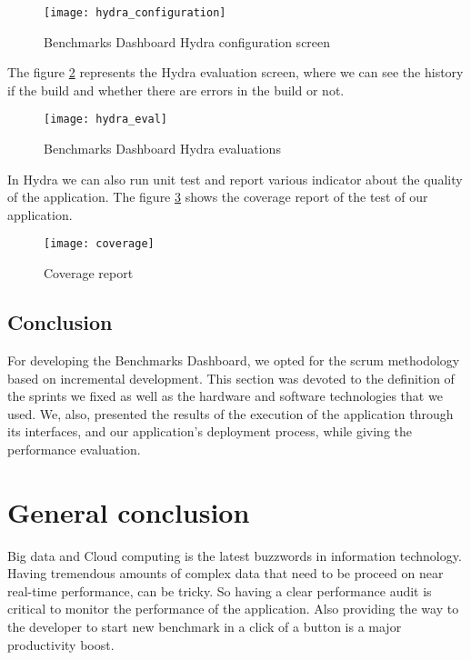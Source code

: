 \begin{figure}[h]
\texttt{[image: hydra\_configuration]}
\caption{Benchmarks Dashboard Hydra configuration screen}
\label{fig:hydra_configuration}
\end{figure}

The figure \hyperref[fig:hydra_eval]{\ref{fig:hydra_eval}} represents the Hydra
evaluation screen, where we can see the history if the build and whether there
are errors in the build or not.

\begin{figure}[h]
\texttt{[image: hydra\_eval]}
\caption{Benchmarks Dashboard Hydra evaluations}
\label{fig:hydra_eval}
\end{figure}

In Hydra we can also run unit test and report various indicator about the
quality of the application. The figure
\hyperref[fig:coverage]{\ref{fig:coverage}} shows the coverage report of the test
of our application.

\begin{figure}[h]
\texttt{[image: coverage]}
\caption{Coverage report}
\label{fig:coverage}
\end{figure}

\clearpage
\section*{Conclusion}
For developing the Benchmarks Dashboard, we opted for the scrum methodology
based on incremental development. This section was devoted to the definition of
the sprints we fixed as well as the hardware and software technologies that we
used. We, also, presented the results of the execution of the application
through its interfaces, and our application's deployment process, while giving
the performance evaluation.

\chapter*{General conclusion}

Big data and Cloud computing is the latest buzzwords in information technology.
Having tremendous amounts of complex data that need to be proceed on near
real-time performance, can be tricky. So having a clear performance audit is
critical to monitor the performance of the application. Also providing the way
to the developer to start new benchmark in a click of a button is a major
productivity boost.

